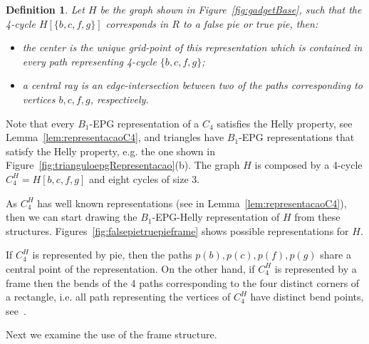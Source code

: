 \documentclass[9pt]{entcs}
\newtheorem{defi}{Definition}[section]
\begin{document}

\begin{defi}
Let $H$ be the graph shown in Figure~\ref{fig:gadgetBase}, such that the 4-cycle $H[\{b, c, f, g \}]$ corresponds in $R$ to a false pie or true pie, then:

\begin{itemize}
\item the \emph{center} is the unique grid-point of this representation which is contained in every path representing 4-cycle $ \{b, c, f, g \}$; \label{lab:lab1}

\item a \emph {central ray} is an edge-intersection  between two of the paths corresponding to vertices  $ b, c, f, g$, respectively.
\end{itemize}
\end{defi}


Note that every $B_1$-EPG representation of a $C_4$ satisfies the Helly property, see Lemma~\ref{lem:representacaoC4}, and triangles have $B_1$-EPG representations that satisfy the Helly property, e.g. the one shown in Figure~\ref{fig:trianguloepgRepresentacao}(b). The graph $H$ is composed by a 4-cycle  $C_4^{H}=H[b, c, f, g]$ and eight cycles of size 3.%

As $C_4^{H}$ has well known representations (see in Lemma~\ref{lem:representacaoC4}), then we can start drawing the $B_{1}$-EPG-Helly representation of $H$ from these structures.  Figures~\ref{fig:falsepietruepieframe} shows possible representations for $H$.



If $C_4^{H}$ is represented by pie, then the paths $p(b), p(c), p(f), p(g)$ share a central point of the representation. On the other hand, if $C_4^{H}$ is represented by a frame then the bends of the 4 paths corresponding to the four distinct corners of a rectangle, i.e. all path representing the vertices of $C_4^{H}$ have distinct bend points, see~\cite{golumbic2009}.

Next we examine the use of the frame structure.

\end{document}
